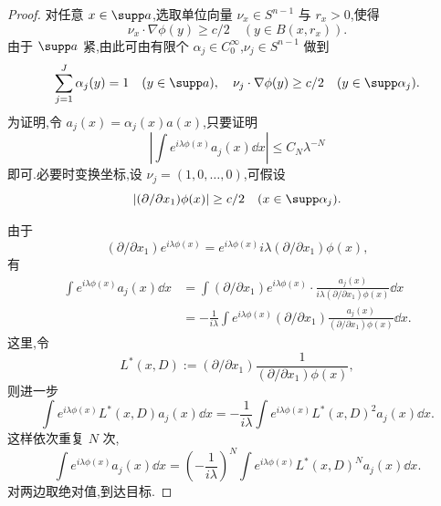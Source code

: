 \begin{proof}
对任意 $x \in \supp a$,选取单位向量 $\nu_{x} \in S^{n-1}$ 与 $r_{x} > 0$,使得
\begin{equation*}
\nu_{x}\cdot\nabla\phi(y) \geq c/2 \quad (y \in B(x, r_{x})).
\end{equation*}
由于 $\supp a$ 紧,由此可由有限个 $\alpha_{j} \in C_{0}^{\infty}$,$\nu_{j} \in S^{n-1}$ 做到
\begin{equation*}
\sum_{j=1}^{J}\alpha_{j}(y) = 1 \quad (y \in \supp a), \quad \nu_{j}\cdot\nabla\phi(y) \geq c/2 \quad (y \in \supp\alpha_{j}).
\end{equation*}
为证明,令 $a_{j}(x) = \alpha_{j}(x)a(x)$,只要证明
\begin{equation*}
\left|\int e^{i\lambda\phi(x)}a_{j}(x)\dd x\right| \leq C_{N}\lambda^{-N}
\end{equation*}
即可.必要时变换坐标,设 $\nu_{j} = (1, 0, \ldots, 0)$,可假设
\begin{equation*}
|(\partial/\partial x_{1})\phi(x)| \geq c/2 \quad (x \in \supp\alpha_{j}).
\end{equation*}

由于
\begin{equation*}
(\partial/\partial x_{1})e^{i\lambda\phi(x)} = e^{i\lambda\phi(x)}i\lambda(\partial/\partial x_{1})\phi(x),
\end{equation*}
有
\begin{equation}
\begin{aligned}
\int e^{i\lambda\phi(x)}a_{j}(x)\dd x & = \int(\partial/\partial x_{1})e^{i\lambda\phi(x)}\cdot\frac{a_{j}(x)}{i\lambda(\partial/\partial x_{1})\phi(x)}\dd x \\
& = -\frac{1}{i\lambda}\int e^{i\lambda\phi(x)}(\partial/\partial x_{1})\frac{a_{j}(x)}{(\partial/\partial x_{1})\phi(x)}\dd x.
\end{aligned}
\end{equation}
这里,令
\begin{equation*}
L^{*}(x, D) := (\partial/\partial x_{1})\frac{1}{(\partial/\partial x_{1})\phi(x)},
\end{equation*}
则进一步
\begin{equation*}
\int e^{i\lambda\phi(x)}L^{*}(x, D)a_{j}(x)\dd x = -\frac{1}{i\lambda}\int e^{i\lambda\phi(x)}L^{*}(x, D)^{2}a_{j}(x)\dd x.
\end{equation*}
这样依次重复 $N$ 次,
\begin{equation*}
\int e^{i\lambda\phi(x)}a_{j}(x)\dd x = \left(-\frac{1}{i\lambda}\right)^{N}\int e^{i\lambda\phi(x)}L^{*}(x, D)^{N}a_{j}(x)\dd x.
\end{equation*}
对两边取绝对值,到达目标.
\end{proof}

